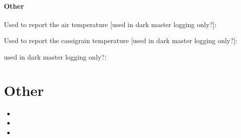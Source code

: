 \documentclass[a4paper,10pt,english]{report}
\begin{document}
\subsubsection{Other}
\label{\detokenize{dev/required_input_header_keys:other}}
Used to report the air temperature {[}used in dark master \textendash{} logging only?{]}:

\begin{sphinxVerbatim}[commandchars=\\\{\}]
                         
\end{sphinxVerbatim}

Used to report the cassigrain temperature {[}used in dark master \textendash{} logging only?{]}:

\begin{sphinxVerbatim}[commandchars=\\\{\}]
                           
\end{sphinxVerbatim}

used in dark master \textendash{} logging only?:

\begin{sphinxVerbatim}[commandchars=\\\{\}]
                        
\end{sphinxVerbatim}


\chapter{Other}
\label{\detokenize{index:other}}\begin{itemize}
\item {} 

\item {} 

\item {} 

\end{itemize}
\end{document}
